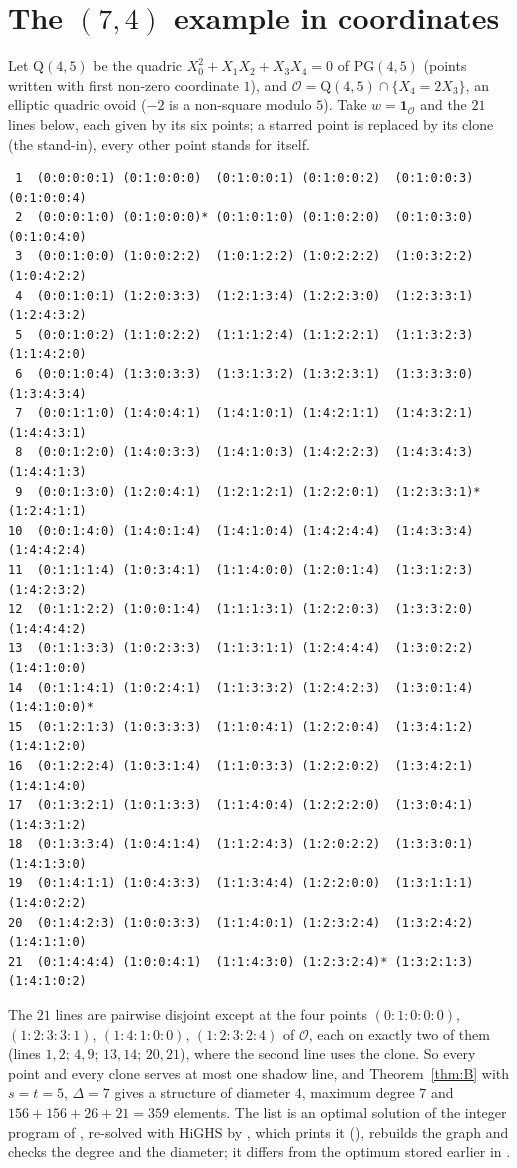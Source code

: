 \documentclass[11pt]{amsart}
\theoremstyle{definition}
\theoremstyle{remark}
\newcommand{\cO}{\mathcal{O}}
\newcommand{\PG}{\mathrm{PG}}
\newcommand{\Qf}{\mathrm{Q}}
\begin{document}
\section{The \texorpdfstring{$(7,4)$}{(7,4)} example in coordinates}\label{app:74}
Let $\Qf(4,5)$ be the quadric $X_0^2+X_1X_2+X_3X_4=0$ of $\PG(4,5)$ (points written with first non-zero coordinate $1$), and $\cO=\Qf(4,5)\cap\{X_4=2X_3\}$, an elliptic quadric ovoid ($-2$ is a non-square modulo $5$). Take $w=\mathbf 1_\cO$ and the $21$ lines below, each given by its six points; a starred point is replaced by its clone (the stand-in), every other point stands for itself.
{\small
\begin{verbatim}
 1  (0:0:0:0:1) (0:1:0:0:0)  (0:1:0:0:1) (0:1:0:0:2)  (0:1:0:0:3)  (0:1:0:0:4)
 2  (0:0:0:1:0) (0:1:0:0:0)* (0:1:0:1:0) (0:1:0:2:0)  (0:1:0:3:0)  (0:1:0:4:0)
 3  (0:0:1:0:0) (1:0:0:2:2)  (1:0:1:2:2) (1:0:2:2:2)  (1:0:3:2:2)  (1:0:4:2:2)
 4  (0:0:1:0:1) (1:2:0:3:3)  (1:2:1:3:4) (1:2:2:3:0)  (1:2:3:3:1)  (1:2:4:3:2)
 5  (0:0:1:0:2) (1:1:0:2:2)  (1:1:1:2:4) (1:1:2:2:1)  (1:1:3:2:3)  (1:1:4:2:0)
 6  (0:0:1:0:4) (1:3:0:3:3)  (1:3:1:3:2) (1:3:2:3:1)  (1:3:3:3:0)  (1:3:4:3:4)
 7  (0:0:1:1:0) (1:4:0:4:1)  (1:4:1:0:1) (1:4:2:1:1)  (1:4:3:2:1)  (1:4:4:3:1)
 8  (0:0:1:2:0) (1:4:0:3:3)  (1:4:1:0:3) (1:4:2:2:3)  (1:4:3:4:3)  (1:4:4:1:3)
 9  (0:0:1:3:0) (1:2:0:4:1)  (1:2:1:2:1) (1:2:2:0:1)  (1:2:3:3:1)* (1:2:4:1:1)
10  (0:0:1:4:0) (1:4:0:1:4)  (1:4:1:0:4) (1:4:2:4:4)  (1:4:3:3:4)  (1:4:4:2:4)
11  (0:1:1:1:4) (1:0:3:4:1)  (1:1:4:0:0) (1:2:0:1:4)  (1:3:1:2:3)  (1:4:2:3:2)
12  (0:1:1:2:2) (1:0:0:1:4)  (1:1:1:3:1) (1:2:2:0:3)  (1:3:3:2:0)  (1:4:4:4:2)
13  (0:1:1:3:3) (1:0:2:3:3)  (1:1:3:1:1) (1:2:4:4:4)  (1:3:0:2:2)  (1:4:1:0:0)
14  (0:1:1:4:1) (1:0:2:4:1)  (1:1:3:3:2) (1:2:4:2:3)  (1:3:0:1:4)  (1:4:1:0:0)*
15  (0:1:2:1:3) (1:0:3:3:3)  (1:1:0:4:1) (1:2:2:0:4)  (1:3:4:1:2)  (1:4:1:2:0)
16  (0:1:2:2:4) (1:0:3:1:4)  (1:1:0:3:3) (1:2:2:0:2)  (1:3:4:2:1)  (1:4:1:4:0)
17  (0:1:3:2:1) (1:0:1:3:3)  (1:1:4:0:4) (1:2:2:2:0)  (1:3:0:4:1)  (1:4:3:1:2)
18  (0:1:3:3:4) (1:0:4:1:4)  (1:1:2:4:3) (1:2:0:2:2)  (1:3:3:0:1)  (1:4:1:3:0)
19  (0:1:4:1:1) (1:0:4:3:3)  (1:1:3:4:4) (1:2:2:0:0)  (1:3:1:1:1)  (1:4:0:2:2)
20  (0:1:4:2:3) (1:0:0:3:3)  (1:1:4:0:1) (1:2:3:2:4)  (1:3:2:4:2)  (1:4:1:1:0)
21  (0:1:4:4:4) (1:0:0:4:1)  (1:1:4:3:0) (1:2:3:2:4)* (1:3:2:1:3)  (1:4:1:0:2)
\end{verbatim}
}
The $21$ lines are pairwise disjoint except at the four points $(0{:}1{:}0{:}0{:}0)$, $(1{:}2{:}3{:}3{:}1)$, $(1{:}4{:}1{:}0{:}0)$, $(1{:}2{:}3{:}2{:}4)$ of $\cO$, each on exactly two of them (lines $1,2$; $4,9$; $13,14$; $20,21$), where the second line uses the clone. So every point and every clone serves at most one shadow line, and Theorem~\ref{thm:B} with $s=t=5$, $\Delta=7$ gives a structure of diameter $4$, maximum degree $7$ and $156+156+26+21=359$ elements. The list is an optimal solution of the integer program of , re-solved with HiGHS by , which prints it (), rebuilds the graph and checks the degree and the diameter; it differs from the optimum stored earlier in .
\end{document}
